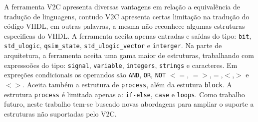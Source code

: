 \par
A ferramenta V2C apresenta diversas vantagens em relação a equivalência de tradução de linguagens, contudo V2C apresenta certas limitação na tradução do código VHDL, em outras palavras, a mesma não reconhece algumas estruturas especificas do VHDL. A ferramenta aceita apenas entradas e saídas do tipo: \texttt{bit}, \texttt{std\_ulogic}, \texttt{qsim\_state}, \texttt{std\_ulogic\_vector} e \texttt{interger}. Na parte de arquitetura, a ferramenta aceita uma gama maior de estruturas, trabalhando com expressoões do tipo: \texttt{signal}, \texttt{variable}, \texttt{integers}, \texttt{strings} e caracteres. Em expreções condicionais os operandos são \texttt{AND}, \texttt{OR}, \texttt{NOT} $<=$, $=>$,$=$,$<$,$>$ e $<>$. Aceita também a estrutura de \texttt{process}, além da estutura \texttt{block}. A estrutura \texttt{process} é limitada apenas a: \texttt{if-else}, \texttt{case} e \texttt{loops}. Como trabalho futuro, neste trabalho tem-se buscado novas abordagens para ampliar o suporte a estruturas não suportadas pelo V2C.

